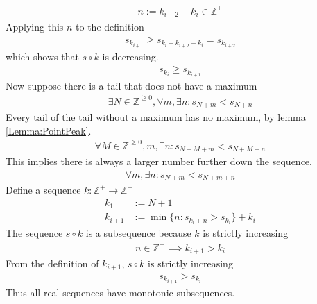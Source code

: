\documentclass{amsart}
\numberwithin{equation}{section}
\let\oldendproof\endproof
\renewenvironment{proof}[1][\proofname]{%
  \setcounter{case}{0}
  \setcounter{step}{0}
  \oldproof[#1]%
}{\oldendproof}
\theoremstyle{plain}
\theoremstyle{definition}
\theoremstyle{remark}
\begin{document}
\begin{proof}
  \begin{align}
    n:= k_{i+2} - k_i \in \mathbb{Z}^+
  \end{align}
  Applying this $n$ to the definition
  \begin{align}
    s_{k_{i+1}} \geq s_{k_i+k_{i+2}-k_i} = s_{k_{i+2}}
  \end{align}
  which shows that $s\circ k$ is decreasing.
  \begin{align}
    s_{k_i} \geq s_{k_{i+1}}
  \end{align}
  Now suppose there is a tail that does not have a maximum
  \begin{align}
    \exists N\in\mathbb{Z}^{\geq 0}, \forall m, \exists n: s_{N+m} < s_{N+n}\nonumber
  \end{align}
  Every tail of the tail without a maximum has no maximum, by lemma \ref{Lemma:PointPeak}.
  \begin{align}
    \forall M\in\mathbb{Z}^{\geq 0}, m, \exists n: s_{N+M+m} < s_{N+M+n}
  \end{align}
  This implies there is always a larger number further down the sequence.
  \begin{align}
    \forall m, \exists n: s_{N+m} < s_{N+m+n}
  \end{align}
  Define a sequence $k:\mathbb{Z}^+ \to \mathbb{Z}^+$
  \begin{align}
    k_1&:= N+1\\
    k_{i+1} &:= \min\{ n : s_{k_i+n} > s_{k_i} \} +k_i
  \end{align}
  The sequence $s\circ k$ is a subsequence because $k$ is strictly increasing
  \begin{align}
    n \in \mathbb{Z}^+ \implies k_{i+1} > k_i
  \end{align}
  From the definition of $k_{i+1}$, $s\circ k$ is strictly increasing
  \begin{align}
    s_{k_{i+1}} > s_{k_i}
  \end{align}
  Thus all real sequences have monotonic subsequences.
\end{proof}
\end{document}
